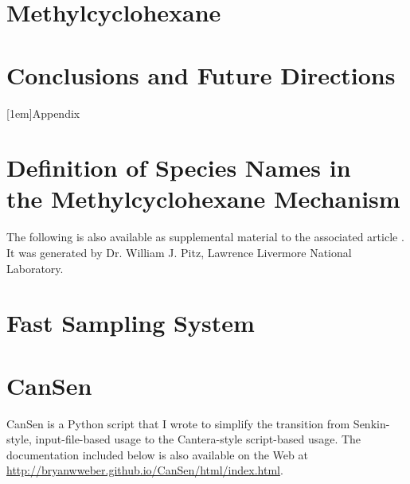 \documentclass[12pt,letterpaper,oneside,final]{book}
\begin{document}
\chapter{Methylcyclohexane}
\label{chap:mch}

\cleardoublepage

\chapter{Conclusions and Future Directions}
\label{chap:conclusions}

\cleardoublepage

\printbibliography[heading=bibintoc]

\begin{appendices}
\makeatletter
\addappheadtotoc
{}
[1em]{}{Appendix \thecontentslabel\quad}{}{\contentspage}
%
\makeatother
{}

\chapter[Definition of Species Names in the Methylcyclohexane Mechanism]%
{Definition of Species Names in\\the Methylcyclohexane Mechanism}
\label{app:mch-dict}
The following is also available as supplemental material to the associated article \cite{Weber2014}.
It was generated by Dr. William J. Pitz, Lawrence Livermore National Laboratory.



\chapter{Fast Sampling System}
\label{app:fast-sampling-system}



\chapter{CanSen}
\label{app:cansen}
CanSen is a Python script that I wrote to simplify the transition from
Senkin-style, input-file-based usage to the Cantera-style script-based usage.
The documentation included below is also available on the Web at
\url{http://bryanwweber.github.io/CanSen/html/index.html}.


\end{appendices}
\end{document}
